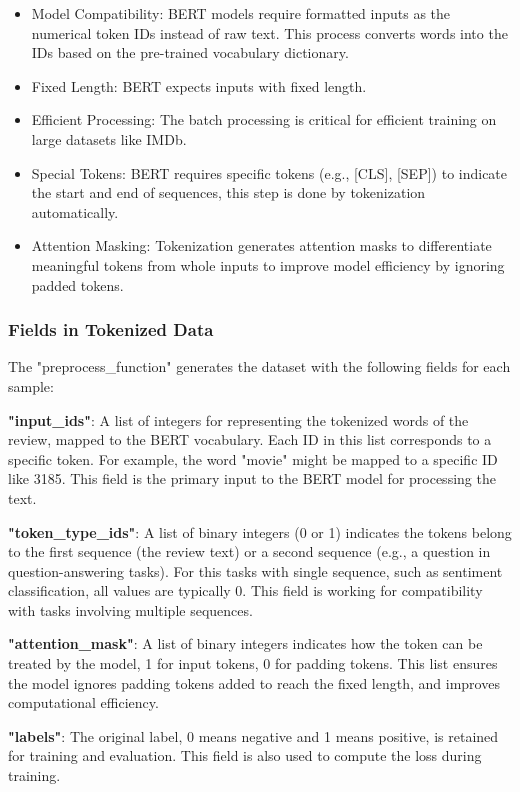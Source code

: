 \begin{itemize}
    \item Model Compatibility: BERT models require formatted inputs as the numerical token IDs instead of raw text. This process converts words into the IDs based on the pre-trained vocabulary dictionary.
    \item Fixed Length: BERT expects inputs with fixed length. 
    \item Efficient Processing: The batch processing is critical for efficient training on large datasets like IMDb.
    \item Special Tokens: BERT requires specific tokens (e.g., [CLS], [SEP]) to indicate the start and end of sequences, this step is done by tokenization automatically.
    \item Attention Masking: Tokenization generates attention masks to differentiate meaningful tokens from whole inputs to improve model efficiency by ignoring padded tokens.
\end{itemize}

\subsubsection{Fields in Tokenized Data}

The "preprocess\_function" generates the dataset with the following fields for each sample:

\textbf{"input\_ids"}: A list of integers for representing the tokenized words of the review, mapped to the BERT vocabulary. Each ID in this list corresponds to a specific token. For example, the word "movie" might be mapped to a specific ID like 3185. This field is the primary input to the BERT model for processing the text.

\textbf{"token\_type\_ids"}: A list of binary integers (0 or 1) indicates the tokens belong to the first sequence (the review text) or a second sequence (e.g., a question in question-answering tasks). For this tasks with single sequence, such as sentiment classification, all values are typically 0. This field is working for compatibility with tasks involving multiple sequences.

\textbf{"attention\_mask"}: A list of binary integers indicates how the token can be treated by the model, 1 for input tokens, 0 for padding tokens. This list ensures the model ignores padding tokens added to reach the fixed length, and improves computational efficiency.

\textbf{"labels"}: The original label, 0 means negative and 1 means positive, is retained for training and evaluation. This field is also used to compute the loss during training.

